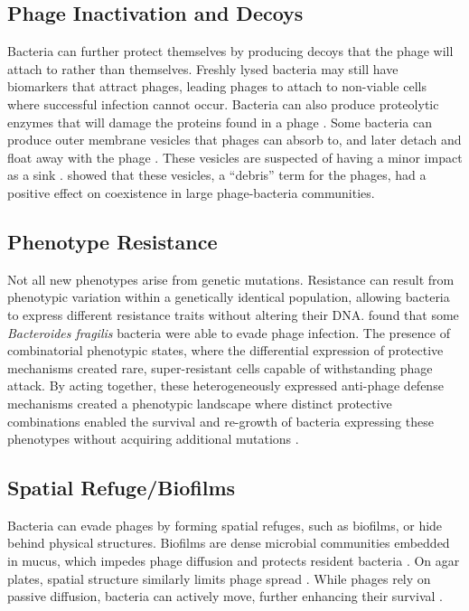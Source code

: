 \subsection{Phage Inactivation and Decoys}
Bacteria can further protect themselves by producing decoys that the phage will attach to rather than themselves. 
Freshly lysed bacteria may still have biomarkers that attract phages, leading phages to attach to non-viable cells where successful infection cannot occur.
Bacteria can also produce proteolytic enzymes that will damage the proteins found in a phage \cite{tanQuorumSensingDetermines2015}. 
Some bacteria can produce outer membrane vesicles that phages can absorb to, and later detach and float away with the phage \cite{rabinovitchBacterialDebrisEcological2003}. 
These vesicles are suspected of having a minor impact as a sink \cite{bullPhageBacterialDynamicsSpatial2018}. 
\citet{deyEmergentHigherorderInteractions2025} showed that these vesicles, a “debris” term for the phages, had a positive effect on coexistence in large phage-bacteria communities. 

\subsection{Phenotype Resistance}
Not all new phenotypes arise from genetic mutations. 
Resistance can result from phenotypic variation within a genetically identical population, allowing bacteria to express different resistance traits without altering their DNA.
\citet{guptaCombinatorialPhenotypicLandscape2025} found that some \textit{Bacteroides fragilis} bacteria were able to evade phage infection.  
The presence of combinatorial phenotypic states, where the differential expression of protective mechanisms created rare, super-resistant cells capable of withstanding phage attack.
By acting together, these heterogeneously expressed anti-phage defense mechanisms created a phenotypic landscape where distinct protective combinations enabled the survival and re-growth of bacteria expressing these phenotypes without acquiring additional mutations \cite{guptaCombinatorialPhenotypicLandscape2025}. 

\subsection{Spatial Refuge/Biofilms} 
Bacteria can evade phages by forming spatial refuges, such as biofilms, or hide behind physical structures. 
Biofilms are dense microbial communities embedded in mucus, which impedes phage diffusion and protects resident bacteria \cite{abedonPhageDelayEnhancing2017}. 
On agar plates, spatial structure similarly limits phage spread \cite{eriksenGrowingMicrocolonyCan2018}. 
While phages rely on passive diffusion, bacteria can actively move, further enhancing their survival \cite{lohrmannInfluenceBacterialSwimming2024}.

